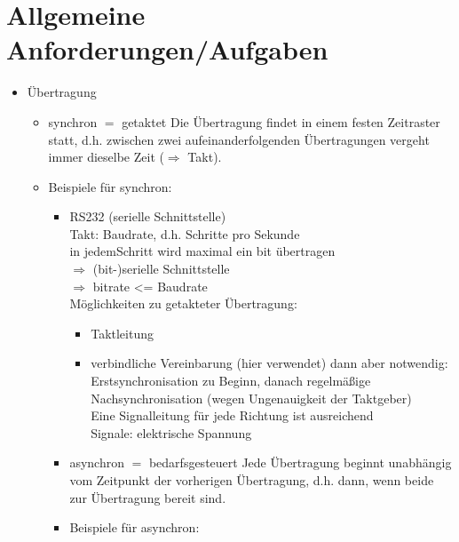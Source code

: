 \section{Allgemeine Anforderungen/Aufgaben}
\begin{itemize}
\item Übertragung
\begin{itemize}
\item synchron $=$ getaktet
Die Übertragung findet in einem festen Zeitraster statt, d.h. zwischen zwei aufeinanderfolgenden Übertragungen vergeht immer dieselbe Zeit ($\Rightarrow$ Takt).
\item Beispiele für synchron:
\begin{itemize}
\item  RS232 (serielle Schnittstelle)\\
Takt: Baudrate, d.h. Schritte pro Sekunde\\
in jedemSchritt wird maximal ein bit übertragen\\
$\Rightarrow$ (bit-)serielle Schnittstelle\\
$\Rightarrow$ bitrate <= Baudrate\\
Möglichkeiten zu getakteter Übertragung:
\begin{itemize}
\item Taktleitung
\item verbindliche Vereinbarung (hier verwendet) dann aber notwendig:\\
Erstsynchronisation zu Beginn, danach regelmäßige Nachsynchronisation (wegen Ungenauigkeit der Taktgeber)\\
Eine Signalleitung für jede Richtung ist ausreichend\\
Signale: elektrische Spannung
\end{itemize}
\item asynchron $=$ bedarfsgesteuert
Jede Übertragung beginnt unabhängig vom Zeitpunkt der vorherigen Übertragung, d.h. dann, wenn beide zur Übertragung bereit sind.
\item Beispiele für asynchron:
\end{itemize}
\end{itemize}
\end{itemize}


